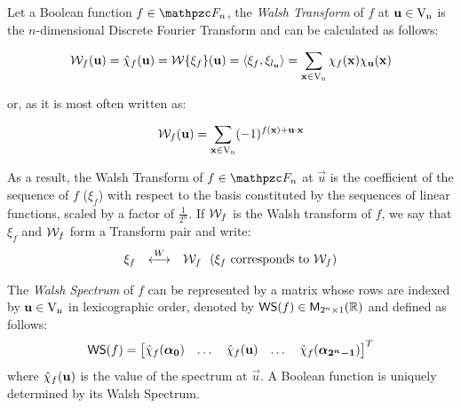 \begin{definition}\label{def:WT}
Let a Boolean function $f \in \funct{F}_n$, the \textsl{Walsh Transform} of $f$ at $\vec{u} \in \gf{V_n}$ is the $n$-dimensional Discrete Fourier Transform and can be calculated as follows:

\begin{equation}\label{WalshTransformInner}
\W_f(\vec{u}) = \walsh{\chi}_f(\vec{u}) = \W\{ \xi_f \}(\vec{u}) = \left\langle \xi_f, \xi_{l_{\vec{u}}} \right\rangle
= \sum_{\vec{x} \in \gf{V_n}} \chi_f(\vec{x}) \chi_{\vec{u}}(\vec{x}) 
\end{equation}

or, as it is most often written as:

\begin{equation}\label{WalshTransform}
\W_f(\vec{u}) = \sum_{\vec{x} \in \gf{V_n}} (-1)^{f(\vec{x}) + \vec{u} \cdot \vec{x}} 
\end{equation}

As a result, the Walsh Transform of $f \in \funct{F}_n$ at $\vec{u}$ is the coefficient of the sequence of $f$ ($\xi_f$) with respect to the basis constituted by the sequences of linear functions, scaled by a factor of $\frac{1}{2^n}$. If $\W_f$ is the Walsh transform of $f$, we say that $\xi_f$ and $\W_f$ form a Transform pair and write:
\begin{equation}
\begin{array}{rcl}
    \xi_f&\stackrel{W}{\longleftrightarrow}&\W_f \ \ ( \xi_f \mbox{ corresponds to } \W_f ) 
\end{array}
\end{equation}

\end{definition}

\begin{definition}
The \textsl{Walsh Spectrum} of $f$ can be represented by a matrix whose rows are indexed by $\vec{u} \in \gf{V_n}$ in lexicographic order, denoted by $\matr{WS}(f) \in \matr{M}_{2^n \times 1}(\bbbr)$ and defined as follows:
\begin{equation}
    \matr{WS}(f) = \begin{bmatrix} \walsh{\chi}_f(\boldsymbol{\alpha_0})&\dots&\walsh{\chi}_f(\vec{u})&\dots&\walsh{\chi}_f(\boldsymbol{\alpha_{2^n-1}}) \end{bmatrix}^{T} 
\end{equation}
where $\walsh{\chi}_f(\vec{u})$ is the value of the spectrum at $\vec{u}$. A Boolean function is uniquely determined by its Walsh Spectrum.
\end{definition}

